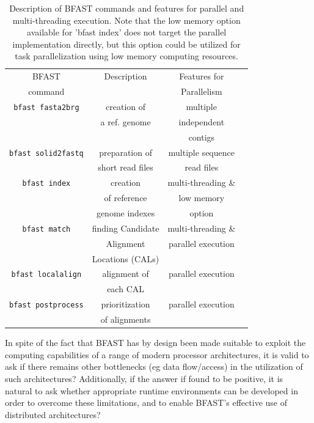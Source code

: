\documentclass{acm_proc_article-sp}
\begin{document}
\begin{table}
\small
\begin{tabular}{|c|c|c|c|} 
  \hline BFAST & Description & Features for \\ command & & Parallelism
  \\ \hline \hline \texttt{bfast fasta2brg} & creation of & multiple \\ &a ref. genome &
  independent \\ & & contigs \\ \hline
  \texttt{bfast solid2fastq} & preparation of & multiple sequence \\ & short
  read files & read files\\ \hline

\texttt{bfast index} & creation  & multi-threading \& \\
& of reference  & low memory  \\ 
&genome indexes&option \\
 
  \hline
\texttt{bfast match} & finding Candidate   &  multi-threading \& \\

& Alignment &  parallel execution \\
& Locations (CALs) & \\\hline
\texttt{bfast localalign} & alignment of&   parallel execution \\
&  each CAL   & \\

  \hline
\texttt{bfast postprocess} & prioritization   &  parallel execution \\ 
& of alignments & \\
\hline


\hline
\end{tabular} \caption{Description of BFAST commands and features for parallel and multi-threading execution. Note that the low memory option available for 'bfast index' does not target the parallel implementation directly, but this option could be utilized for task parallelization using low memory computing resources.}
 \label{table:bfast-summary} 
\end{table}

In spite of the fact that BFAST has by design been made suitable to
exploit the computing capabilities of a range of modern processor
architectures, it is valid to ask if there remains other bottlenecks
(eg data flow/access) in the utilization of such architectures?
Additionally, if the answer if found to be positive, it is natural to
ask whether appropriate runtime environments can be developed in order
to overcome these limitations, and to enable BFAST's effective use of
distributed architectures?
\end{document}
